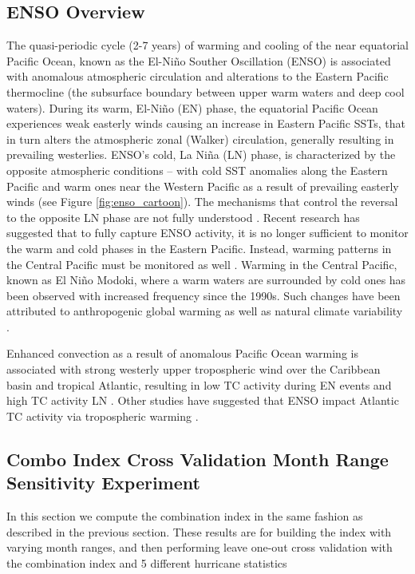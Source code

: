 \documentclass[]{article}
\begin{document}
\subsection{ENSO Overview}
The quasi-periodic cycle (2-7 years) of warming and cooling of the near equatorial Pacific Ocean, known as the El-Ni\~no Souther Oscillation (ENSO) is associated with anomalous atmospheric circulation and alterations to the Eastern Pacific thermocline (the subsurface boundary between upper warm waters and deep cool waters). During its warm, El-Ni\~no (EN) phase, the equatorial Pacific Ocean experiences weak easterly winds causing an increase in Eastern Pacific SSTs, that in turn alters the atmospheric zonal (Walker) circulation, generally resulting in prevailing westerlies. ENSO's cold, La Ni\~na (LN) phase, is characterized by the opposite atmospheric conditions -- with cold SST anomalies along the Eastern Pacific and warm ones near the Western Pacific as a result of prevailing easterly winds (see Figure \ref{fig:enso_cartoon}). The mechanisms that control the reversal to the opposite LN phase are not fully understood \cite{kirtman1997,smith2012}. Recent research has suggested that to fully capture ENSO activity, it is no longer sufficient to monitor the warm and cold phases in the Eastern Pacific. Instead, warming patterns in the Central Pacific must be monitored as well \cite{ashok2007}. Warming in the Central Pacific, known as El Ni\~no Modoki, where a warm waters are surrounded by cold ones has been observed with increased frequency since the 1990s. Such changes have been attributed to anthropogenic global warming \cite{yeh2009} as well as natural climate variability \cite{wittenberg2009}.

Enhanced convection as a result of anomalous Pacific Ocean warming is associated with strong westerly upper tropospheric wind over the Caribbean basin and tropical Atlantic, resulting in low TC activity during EN events and high TC activity LN \cite{gray1984a}. Other studies have suggested that ENSO impact Atlantic TC activity via tropospheric warming \cite{tang2004}. 
\clearpage
\subsection{Combo Index Cross Validation Month Range Sensitivity Experiment}
In this section we compute the combination index in the same fashion as described in the previous section.  These results are for building the index with varying month ranges, and then performing leave one-out cross validation with the combination index and 5 different hurricane statistics 
\end{document}
